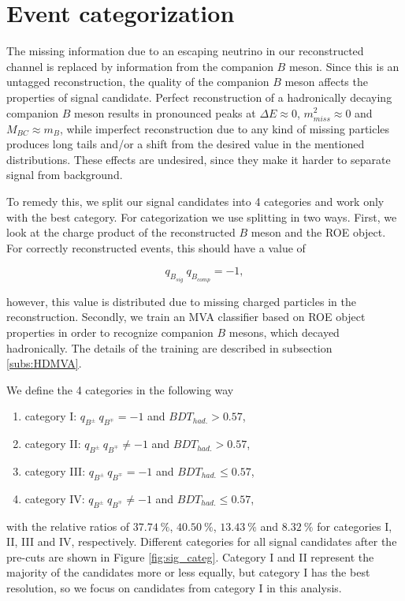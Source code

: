 \documentclass[headings=standardclasses,headings=big,oneside,a4paper,openany,12pt]{scrbook}
\begin{document}
\section{Event categorization}\label{sec:event-categorization}

The missing information due to an escaping neutrino in our reconstructed channel is replaced by information from the companion $B$ meson. Since this is an untagged reconstruction, the quality of the companion $B$ meson affects the properties of signal candidate. Perfect reconstruction of a hadronically decaying companion $B$ meson results in pronounced peaks at $\Delta E \approx 0$, $m_{miss}^2 \approx 0$ and $M_{BC} \approx m_B$, while imperfect reconstruction due to any kind of missing particles produces long tails and/or a shift from the desired value in the mentioned distributions. These effects are undesired, since they make it harder to separate signal from background.

To remedy this, we split our signal candidates into 4 categories and work only with the best category. For categorization we use splitting in two ways. First, we look at the charge product of the reconstructed $B$ meson and the ROE object. For correctly reconstructed events, this should have a value of 

\begin{equation}
\label{eq:chargeprod}
q_{B_{sig}}~q_{B_{comp}} = -1,
\end{equation}

however, this value is distributed due to missing charged particles in the reconstruction. Secondly, we train an MVA classifier based on ROE object properties in order to recognize companion $B$ mesons, which decayed hadronically. The details of the training are described in subsection \ref{subs:HDMVA}.

We define the 4 categories in the following way
\begin{enumerate} 
\item[]category I: $q_{B^\pm}~q_{B^\mp} = -1$ and $BDT_{had.} > 0.57$,
\item[]category II: $q_{B^\pm}~q_{B^\mp} \neq -1$ and $BDT_{had.} > 0.57$,
\item[]category III: $q_{B^\pm}~q_{B^\mp} = -1$ and $BDT_{had.} \leq 0.57$,
\item[]category IV: $q_{B^\pm}~q_{B^\mp} \neq -1$ and $BDT_{had.} \leq 0.57$,
\end{enumerate}

with the relative ratios of $37.74~\%$, $40.50~\%$, $13.43~\%$ and $8.32~\%$ for categories I, II, III and IV, respectively. Different categories for all signal candidates after the pre-cuts are shown in Figure \ref{fig:sig_categ}. Category I and II represent the majority of the candidates more or less equally, but category I has the best resolution, so we focus on candidates from category I in this analysis.
\end{document}
